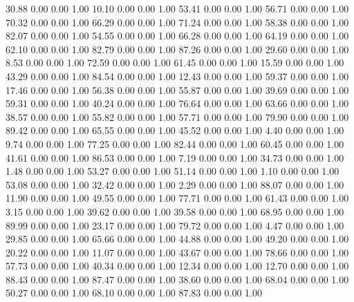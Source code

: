    30.88   0.00   0.00   1.00
   10.10   0.00   0.00   1.00
   53.41   0.00   0.00   1.00
   56.71   0.00   0.00   1.00
   70.32   0.00   0.00   1.00
   66.29   0.00   0.00   1.00
   71.24   0.00   0.00   1.00
   58.38   0.00   0.00   1.00
   82.07   0.00   0.00   1.00
   54.55   0.00   0.00   1.00
   66.28   0.00   0.00   1.00
   64.19   0.00   0.00   1.00
   62.10   0.00   0.00   1.00
   82.79   0.00   0.00   1.00
   87.26   0.00   0.00   1.00
   29.60   0.00   0.00   1.00
    8.53   0.00   0.00   1.00
   72.59   0.00   0.00   1.00
   61.45   0.00   0.00   1.00
   15.59   0.00   0.00   1.00
   43.29   0.00   0.00   1.00
   84.54   0.00   0.00   1.00
   12.43   0.00   0.00   1.00
   59.37   0.00   0.00   1.00
   17.46   0.00   0.00   1.00
   56.38   0.00   0.00   1.00
   55.87   0.00   0.00   1.00
   39.69   0.00   0.00   1.00
   59.31   0.00   0.00   1.00
   40.24   0.00   0.00   1.00
   76.64   0.00   0.00   1.00
   63.66   0.00   0.00   1.00
   38.57   0.00   0.00   1.00
   55.82   0.00   0.00   1.00
   57.71   0.00   0.00   1.00
   79.90   0.00   0.00   1.00
   89.42   0.00   0.00   1.00
   65.55   0.00   0.00   1.00
   45.52   0.00   0.00   1.00
    4.40   0.00   0.00   1.00
    9.74   0.00   0.00   1.00
   77.25   0.00   0.00   1.00
   82.44   0.00   0.00   1.00
   60.45   0.00   0.00   1.00
   41.61   0.00   0.00   1.00
   86.53   0.00   0.00   1.00
    7.19   0.00   0.00   1.00
   34.73   0.00   0.00   1.00
    1.48   0.00   0.00   1.00
   53.27   0.00   0.00   1.00
   51.14   0.00   0.00   1.00
    1.10   0.00   0.00   1.00
   53.08   0.00   0.00   1.00
   32.42   0.00   0.00   1.00
    2.29   0.00   0.00   1.00
   88.07   0.00   0.00   1.00
   11.90   0.00   0.00   1.00
   49.55   0.00   0.00   1.00
   77.71   0.00   0.00   1.00
   61.43   0.00   0.00   1.00
    3.15   0.00   0.00   1.00
   39.62   0.00   0.00   1.00
   39.58   0.00   0.00   1.00
   68.95   0.00   0.00   1.00
   89.99   0.00   0.00   1.00
   23.17   0.00   0.00   1.00
   79.72   0.00   0.00   1.00
    4.47   0.00   0.00   1.00
   29.85   0.00   0.00   1.00
   65.66   0.00   0.00   1.00
   44.88   0.00   0.00   1.00
   49.20   0.00   0.00   1.00
   20.22   0.00   0.00   1.00
   11.07   0.00   0.00   1.00
   43.67   0.00   0.00   1.00
   78.66   0.00   0.00   1.00
   57.73   0.00   0.00   1.00
   40.34   0.00   0.00   1.00
   12.34   0.00   0.00   1.00
   12.70   0.00   0.00   1.00
   88.43   0.00   0.00   1.00
   87.47   0.00   0.00   1.00
   38.60   0.00   0.00   1.00
   68.04   0.00   0.00   1.00
   50.27   0.00   0.00   1.00
   68.10   0.00   0.00   1.00
   87.83   0.00   0.00   1.00
